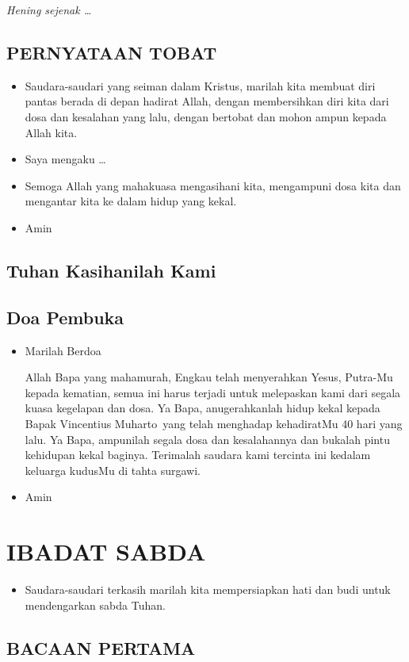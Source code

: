 \documentclass[a5paper,headsepline,titlepage,11pt,nnormalheadings,DIVcalc]{scrbook}
\newcommand{\BU}[1]{\begin{itemize} \item[U:] #1 \end{itemize}}
\newcommand{\BP}[1]{\begin{itemize} \item[P:] #1 \end{itemize}}
\newcommand{\namaalm}{Bapak Vincentius Muharto~}
\begin{document}
\emph{Hening sejenak \dots}
  
\subsection*{PERNYATAAN TOBAT}
\BP{Saudara-saudari yang seiman dalam Kristus, marilah kita membuat diri pantas berada di depan hadirat Allah, dengan membersihkan diri kita dari dosa dan kesalahan yang lalu, dengan bertobat dan mohon ampun kepada Allah kita.}

\BP{Saya mengaku \dots}

\BP{Semoga Allah yang mahakuasa mengasihani kita, 
mengampuni dosa kita dan mengantar kita ke dalam hidup 
yang kekal.}

\BU{Amin}

\subsection*{Tuhan Kasihanilah Kami}

\subsection*{Doa Pembuka}
\BP{Marilah Berdoa 

Allah Bapa yang mahamurah, Engkau telah menyerahkan 
Yesus, Putra-Mu kepada kematian, semua ini harus terjadi 
untuk melepaskan kami dari segala kuasa kegelapan dan 
dosa. Ya Bapa, anugerahkanlah hidup kekal kepada 
\namaalm yang telah menghadap 
kehadiratMu 40 hari yang lalu. Ya Bapa, ampunilah 
segala dosa dan kesalahannya dan bukalah pintu 
kehidupan kekal baginya. Terimalah saudara kami 
tercinta ini kedalam keluarga kudusMu di tahta surgawi. }

\BU{Amin} 
 
\section*{IBADAT SABDA}
\BP{Saudara-saudari terkasih marilah kita mempersiapkan hati 
dan budi untuk mendengarkan sabda Tuhan.} 

\subsection*{BACAAN PERTAMA}
\end{document}
